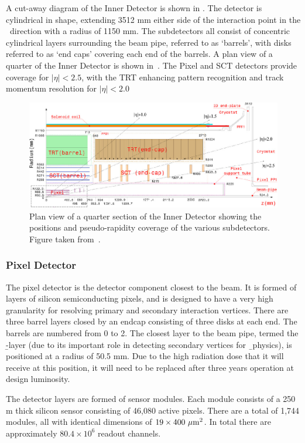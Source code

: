 A cut-away diagram of the Inner Detector is shown in . The detector
is cylindrical in shape, extending 3512 mm either side of the interaction point
in the \z\ direction with a radius of 1150 mm. The subdetectors all consist of
concentric cylindrical layers surrounding the beam pipe, referred to as
`barrels', with disks referred to as `end caps' covering each end of the
barrels. A plan view of a quarter of the Inner Detector is shown
in~. The Pixel and SCT detectors provide coverage for $|\eta|<2.5$,
with the TRT enhancing pattern recognition and track momentum resolution for
$|\eta|<2.0$

\begin{figure}[h]
\centering
\includegraphics[width=\textwidth]{FigID26-mod-011107_crop}
\caption{Plan view of a quarter section of the Inner Detector showing the
positions and pseudo-rapidity coverage of the various subdetectors. Figure taken from~\cite{Aad:1125884}.}
\label{fig:id-plan}
\end{figure}

\subsubsection{Pixel Detector}

The pixel detector is the detector component closest to the beam. It is formed
of layers of silicon semiconducting pixels, and is designed to have a very
high granularity for resolving primary and secondary interaction vertices. There
are three barrel layers closed by an endcap consisting of three disks at each
end. The barrels are numbered from 0 to 2. The closest layer to the beam
pipe, termed the \b-layer (due to its important role in detecting secondary
vertices for \b\ physics), is
positioned at a radius of 50.5 mm. Due to the high radiation dose that it will receive at this position, it will need to be replaced after three years
operation at design luminosity.

The detector layers are formed of sensor modules. Each module consists of a 250 \micro m thick
silicon sensor consisting of 46,080 active pixels. There are a total of 1,744
modules, all with identical dimensions of $19\times400~\mu \rm{m}^{2}$. In total
there are approximately $80.4\times 10^{6}$ readout channels.

